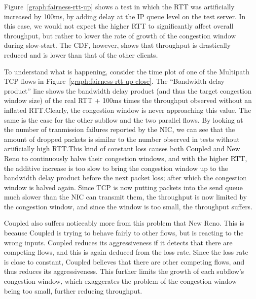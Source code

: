 Figure~\ref{graph:fairness-rtt-up} shows a test in which the RTT was
artificially increased by 100ms, by adding delay at the IP queue level on the
test server. In this case, we would not expect the higher RTT to significantly
affect overall throughput, but rather to lower the rate of growth of the
congestion window during slow-start. The CDF, however, shows that throughput is
drastically reduced and is lower than that of the other clients.

To understand what is happening, consider the time plot of one of the Multipath
TCP flows in Figure~\ref{graph:fairness-rtt-up-close}. The ``Bandwidth delay
product'' line shows the bandwidth delay product (and thus the target congestion
window size) of the real RTT + 100ms times the throughput observed without an
inflated RTT.\@ Clearly, the congestion window is never approaching this value.
The same is the case for the other subflow and the two parallel flows. By
looking at the number of tranmission failures reported by the NIC, we can see
that the amount of dropped packets is similar to the number observed in tests
without artificially high RTT.\@ This kind of constant loss causes both Coupled
and New Reno to continuously halve their congestion windows, and with the higher
RTT, the additive increase is too slow to bring the congestion window up to the
bandwidth delay product before the next packet loss; after which the congestion 
window is halved again. Since TCP is now putting packets into the send queue 
much slower than the NIC can transmit them, the throughput is now limited by the 
congestion window, and since the window is too small, the throughput suffers.

Coupled also suffers noticeably more from this problem that New Reno. This is
because Coupled is trying to behave fairly to other flows, but is reacting to
the wrong inputs.  Coupled reduces its aggressiveness if it detects that there
are competing flows, and this is again deduced from the loss rate. Since the
loss rate is close to constant, Coupled believes that there are other competing
flows, and thus reduces its aggressiveness. This further limits the growth of
each subflow's congestion window, which exaggerates the problem of the
congestion window being too small, further reducing throughput.

